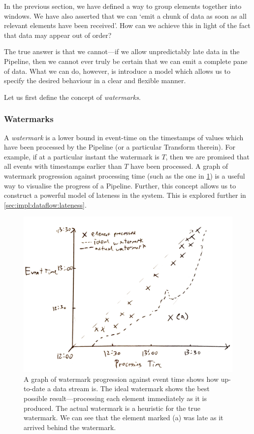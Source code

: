 In the previous section, we have defined a way to group elements together into windows.
We have also asserted that we can `emit a chunk of data as soon as all relevant elements have been received'.
How can we achieve this in light of the fact that data may appear out of order?

The true answer is that we cannot---if we allow unpredictably late data in the Pipeline, then we cannot ever truly be certain that we can emit a complete pane of data.
What we can do, however, is introduce a model which allows us to specify the desired behaviour in a clear and flexible manner.

Let us first define the concept of \emph{watermarks}.

\subsubsection{Watermarks}

A \emph{watermark} is a lower bound in event-time on the timestamps of values which have been processed by the Pipeline (or a particular Transform therein).
For example, if at a particular instant the watermark is $T$, then we are promised that all events with timestamps earlier than $T$ have been processed.
A graph of watermark progression against processing time (such as the one in \cref{fig:prep:watermark-progression}) is a useful way to visualise the progress of a Pipeline.
Further, this concept allows us to construct a powerful model of lateness in the system.
This is explored further in \cref{sec:impl:dataflow:lateness}.

\begin{figure}[h]
	\includegraphics[width=\textwidth]{images/temp/watermark-progression-example}
	\caption[An example of a watermark progression plotted against event time. Late data can be clearly seen as falling behind the watermark.]{A graph of watermark progression against event time shows how up-to-date a data stream is. The ideal watermark shows the best possible result---processing each element immediately as it is produced. The actual watermark is a heuristic for the true watermark. We can see that the element marked (a) was late as it arrived behind the watermark.}
	\label{fig:prep:watermark-progression}
\end{figure}

